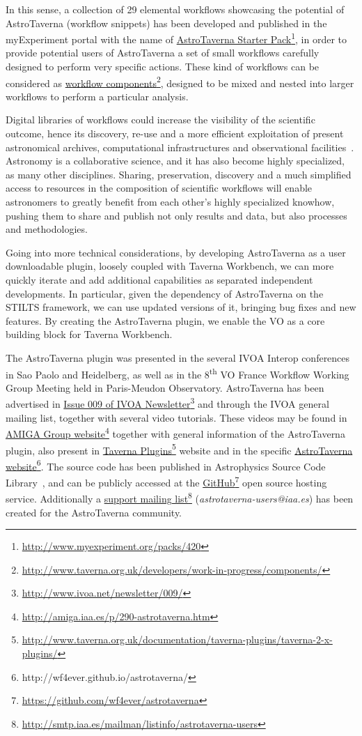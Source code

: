 \documentclass[final,authoryear,5p,times,twocolumn]{elsarticle}
\newcommand{\urlsamefont}[1]{\urlstyle{same}\url{#1}}
\newcommand{\hrefnote}[2]{\href{#1}{#2}\footnote{\urlsamefont{#1}}}
\begin{document}
In this sense, a collection of 29 elemental workflows showcasing the potential of AstroTaverna (workflow snippets) has been developed and published in the myExperiment portal with the name of \hrefnote{http://www.myexperiment.org/packs/420}{\label{starterpack}AstroTaverna Starter Pack}, in order to provide potential users of AstroTaverna a set of small workflows carefully designed to perform very specific actions. These kind of workflows can be considered as \hrefnote{http://www.taverna.org.uk/developers/work-in-progress/components/}{workflow components}, designed to be mixed and nested into larger workflows to perform a particular analysis. 

Digital libraries of workflows could increase the visibility of the scientific outcome, hence its discovery, re-use and a more efficient exploitation of present astronomical archives, computational infrastructures and observational facilities~\citep{Ruiz2012}. Astronomy is a collaborative science, and it has also become highly specialized, as many other disciplines. Sharing, preservation, discovery and a much simplified access to resources in the composition of scientific workflows will enable astronomers to greatly benefit from each other’s highly specialized knowhow, pushing them to share and publish not only results and data, but also processes and methodologies.

Going into more technical considerations, by developing AstroTaverna as a user downloadable plugin, loosely coupled with Taverna Workbench, we can more quickly iterate and add additional capabilities as separated independent developments. In particular, given the dependency of AstroTaverna on the STILTS framework, we can use updated versions of it, bringing bug fixes and new features. By creating the AstroTaverna plugin, we enable the VO as a core building block for Taverna Workbench.

The AstroTaverna plugin was presented in the several IVOA Interop conferences in Sao Paolo and Heidelberg, as well as in the 8\textsuperscript{th} VO France Workflow Working Group Meeting held in Paris-Meudon Observatory. AstroTaverna has been advertised in \hrefnote{http://www.ivoa.net/newsletter/009/}{Issue 009 of IVOA Newsletter} and through the IVOA general mailing list, together with several video tutorials. These videos may be found in \hrefnote{http://amiga.iaa.es/p/290-astrotaverna.htm}{AMIGA Group website} together with general information of the AstroTaverna plugin, also present in \hrefnote{http://www.taverna.org.uk/documentation/taverna-plugins/taverna-2-x-plugins/}{Taverna Plugins} website and in the specific \href{http://wf4ever.github.io/astrotaverna/}{AstroTaverna website}\footnote{\label{website}http://wf4ever.github.io/astrotaverna/}. The source code has been published in Astrophysics Source Code Library~\citep[ASCL; see][]{Garrido2013}, and can be publicly accessed at the \hrefnote{https://github.com/wf4ever/astrotaverna}{GitHub} open source hosting service. Additionally a \hrefnote{http://smtp.iaa.es/mailman/listinfo/astrotaverna-users}{support mailing list} (\textit{astrotaverna-users@iaa.es}) has been created for the AstroTaverna community. 
\end{document}
